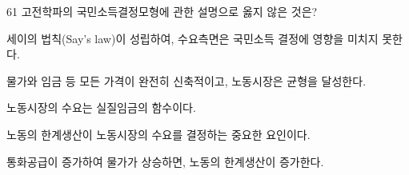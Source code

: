 \begin{question}{61}
고전학파의 국민소득결정모형에 관한 설명으로 옳지 않은 것은?
\begin{choices}
  \item 세이의 법칙(Say's law)이 성립하여, 수요측면은 국민소득 결정에 영향을 미치지 못한다.
  \item 물가와 임금 등 모든 가격이 완전히 신축적이고, 노동시장은 균형을 달성한다.
  \item 노동시장의 수요는 실질임금의 함수이다.
  \item 노동의 한계생산이 노동시장의 수요를 결정하는 중요한 요인이다.
  \item 통화공급이 증가하여 물가가 상승하면, 노동의 한계생산이 증가한다.
\end{choices}
\end{question}
